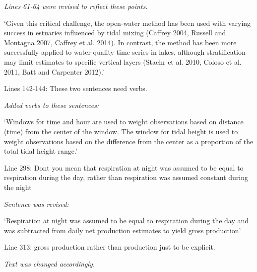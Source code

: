 \documentclass[letterpaper,12pt]{article}\usepackage[]{graphicx}\usepackage[]{color}
\begin{document}
{\it Lines 61-64 were revised to reflect these points.

`Given this critical challenge, the open-water method has been used with varying success in estuaries influenced by tidal mixing (Caffrey 2004, Russell and Montagna 2007, Caffrey et al. 2014).  In contrast, the method has been more successfully applied to water quality time series in lakes, although stratification may limit estimates to specific vertical layers (Staehr et al. 2010, Coloso et al. 2011, Batt and Carpenter 2012).'
}

Lines 142-144: These two sentences need verbs.

{\it Added verbs to these sentences:

`Windows for time and hour are used to weight observations based on distance (time) from the center of the window.  The window for tidal height is used to weight observations based on the difference from the center as a proportion of the total tidal height range.'
}

Line 298: Dont you mean that respiration at night was assumed to be equal to respiration during the day, rather than respiration was assumed constant during the night

{\it Sentence was revised:

`Respiration at night was assumed to be equal to respiration during the day and was subtracted from daily net production estimates to yield gross production'
}

Line 313: gross production rather than production just to be explicit.

{\it Text was changed accordingly.}
\end{document}
